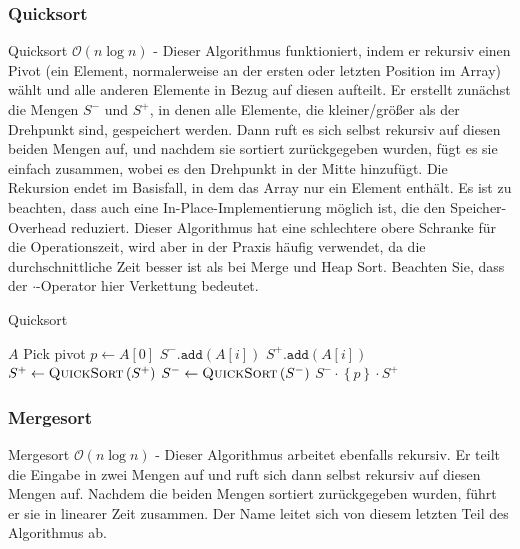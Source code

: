 \documentclass[a4paper]{article}
\begin{document}
\newpage    

    \subsubsection{Quicksort}\label{Quicksort}
    Quicksort $\mathcal{O}(n\log n)$ - Dieser Algorithmus funktioniert, indem er rekursiv einen Pivot (ein Element, normalerweise an der ersten oder letzten Position im Array) wählt und alle anderen Elemente in Bezug auf diesen aufteilt. Er erstellt zunächst die Mengen $S^-$ und $S^+$, in denen alle Elemente, die kleiner/größer als der Drehpunkt sind, gespeichert werden. Dann ruft es sich selbst rekursiv auf diesen beiden Mengen auf, und nachdem sie sortiert zurückgegeben wurden, fügt es sie einfach zusammen, wobei es den Drehpunkt in der Mitte hinzufügt. Die Rekursion endet im Basisfall, in dem das Array nur ein Element enthält. Es ist zu beachten, dass auch eine In-Place-Implementierung möglich ist, die den Speicher-Overhead reduziert. Dieser Algorithmus hat eine schlechtere obere Schranke für die Operationszeit, wird aber in der Praxis häufig verwendet, da die durchschnittliche Zeit besser ist als bei Merge und Heap Sort. Beachten Sie, dass der $\cdot$-Operator hier Verkettung bedeutet.

    \begin{algorithm}[h]
        \caption{Quicksort}
        \begin{algorithmic}
            \label{alg:Quicksort}
        \State \Return $A$
        \EndIf
        \State Pick pivot $p \gets A[0]$
        \State $S^-\texttt{.add}\left(A\left[i\right]\right)$
        \Else
        \State $S^+\texttt{.add}\left(A\left[i\right]\right)$
        \EndIf
        \EndFor
        \State $S^+ \gets \textsc{QuickSort}\left(S^+\right)$
        \State $S^- \gets \textsc{QuickSort}\left(S^-\right)$
        \State \Return $S^- \cdot \left\lbrace p\right\rbrace \cdot S^+$
        \EndFunction
        \end{algorithmic}
        \end{algorithm}
        
\newpage
    \subsubsection{Mergesort}\label{Mergesort}
        Mergesort $\mathcal{O}(n \log n)$ - Dieser Algorithmus arbeitet ebenfalls rekursiv. Er teilt die Eingabe in zwei Mengen auf und ruft sich dann selbst rekursiv auf diesen Mengen auf. Nachdem die beiden Mengen sortiert zurückgegeben wurden, führt er sie in linearer Zeit zusammen. Der Name leitet sich von diesem letzten Teil des Algorithmus ab.
        
\end{document}
